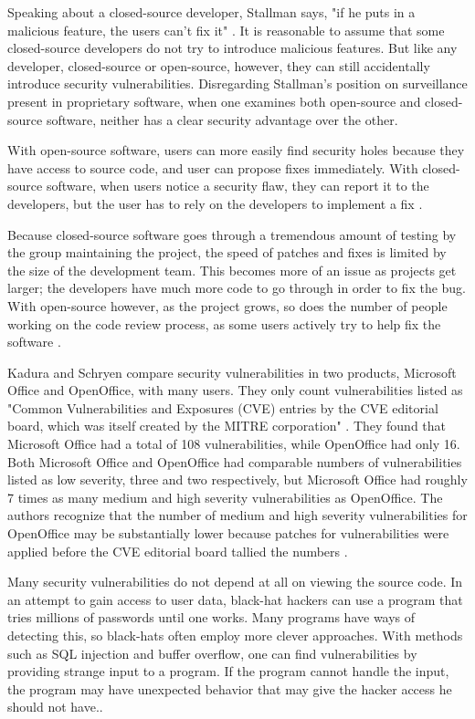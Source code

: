 Speaking about a closed-source developer, Stallman says, "if he puts in a
malicious feature, the users can't fix it" \citeyear[para. 36]{rms2011}.
It is reasonable to assume that some closed-source developers do not try
to introduce malicious features. But like any developer, closed-source or
open-source, however, they can still accidentally introduce security
vulnerabilities. Disregarding Stallman's position on surveillance present in
proprietary software, when one examines both open-source and closed-source
software, neither has a clear security advantage over the other.

With open-source software, users can more easily find security holes because
they have access to source code, and user can propose fixes immediately.
With closed-source software, when users notice a security flaw, they can report
it to the developers, but the user has to rely on the developers to implement a
fix \cite[para. 17]{kadura}.

Because closed-source software goes through a tremendous amount of testing
by the group maintaining the project, the speed of patches and fixes is limited
by the size of the development team. This becomes more of an issue as projects
get larger; the developers have much more code to go through in order to fix the
bug. With open-source however, as the project grows, so does the number of
people working on the code review process, as some users actively try to help
fix the software \cite[p. ~245]{boulanger}.

Kadura and Schryen compare security vulnerabilities in two products, Microsoft
Office and OpenOffice, with many users. They only count vulnerabilities listed
as "Common Vulnerabilities and Exposures (CVE) entries by the CVE editorial
board, which was itself created by the MITRE corporation"
\citeyear{kadura}. They found that Microsoft Office had a total of 108
vulnerabilities, while OpenOffice had only 16. Both Microsoft Office and
OpenOffice had comparable numbers of vulnerabilities listed as low severity,
three and two respectively, but Microsoft Office had roughly 7 times as many
medium and high severity vulnerabilities as OpenOffice. The authors recognize
that the number of medium and high severity vulnerabilities for OpenOffice may
be substantially lower because patches for vulnerabilities were applied before
the CVE editorial board tallied the numbers \cite{kadura}.

Many security vulnerabilities do not depend at all on viewing the source code.
In an attempt to gain access to user data, black-hat hackers can use a program
that tries millions of passwords until one works. Many programs have ways of
detecting this, so black-hats often employ  more clever approaches. With methods
such as SQL injection and buffer overflow, one can find vulnerabilities by
providing strange input to a program. If the program cannot handle the input,
the program may have unexpected behavior that may give the hacker access he
should not have.\cite[p. ~8-9]{clarke}.

